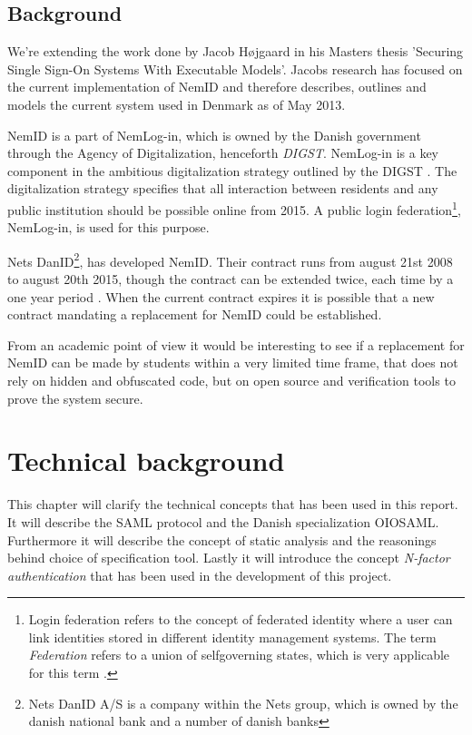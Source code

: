 \documentclass[twosided]{report}
\begin{document}
\section{Background}
We're extending the work done by Jacob H{\o}jgaard in his Masters thesis 'Securing Single Sign-On Systems With Executable Models'. Jacobs research has focused on the current implementation of NemID and therefore describes, outlines and models the current system used in Denmark as of May 2013.
\par
NemID is a part of NemLog-in, which is owned by the Danish government through the Agency of Digitalization, henceforth \emph{DIGST}. NemLog-in is a key component in the ambitious digitalization strategy outlined by the DIGST \cite{digst}. The digitalization strategy specifies that all interaction between residents and any public institution should be possible online from 2015. A public login federation\footnote{Login federation refers to the concept of federated identity where a user can link identities stored in different identity management systems. The term \emph{Federation} refers to a union of selfgoverning states, which is very applicable for this term \cite{jacob}.}, NemLog-in, is used for this purpose.
\par
Nets DanID\footnote{Nets DanID A/S is a company within the Nets group, which is owned by the danish national bank and a number of danish banks}, has developed NemID. Their contract runs from august 21st 2008 to august 20th 2015, though the contract can be extended twice, each time by a one year period \cite{nemidcontract}. When the current contract expires it is possible that a new contract mandating a replacement for NemID could be established.
\par
From an academic point of view it would be interesting to see if a replacement for NemID can be made by students within a very limited time frame, that does not rely on hidden and obfuscated code, but on open source and verification tools to prove the system secure.



\chapter{Technical background}
This chapter will clarify the technical concepts that has been used in this report. It will describe the SAML protocol and the Danish specialization OIOSAML. Furthermore it will describe the concept of static analysis and the reasonings behind choice of specification tool. Lastly it will introduce the concept \emph{N-factor authentication} that has been used in the development of this project.
\end{document}
